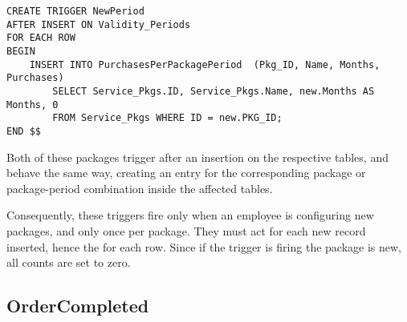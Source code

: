 \begin{lstlisting}[style=SQL]
CREATE TRIGGER NewPeriod
AFTER INSERT ON Validity_Periods
FOR EACH ROW
BEGIN
    INSERT INTO PurchasesPerPackagePeriod  (Pkg_ID, Name, Months, Purchases)
        SELECT Service_Pkgs.ID, Service_Pkgs.Name, new.Months AS Months, 0
        FROM Service_Pkgs WHERE ID = new.PKG_ID;
END $$
\end{lstlisting}

Both of these packages trigger after an insertion on the respective tables, and behave the same way, creating an entry
for the corresponding package or package-period combination inside the affected tables.

Consequently, these triggers fire only when an employee is configuring new packages, and only once per package. They
must act for each new record inserted, hence the for each row. Since if the trigger is firing the package is new, all
counts are set to zero.

\subsection{OrderCompleted}

